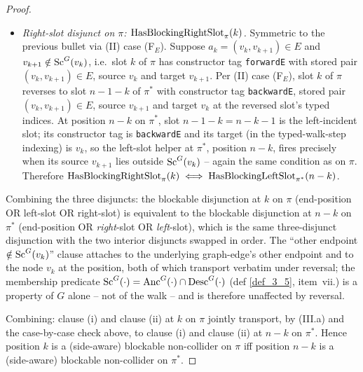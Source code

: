 \documentclass[main]{subfiles}
\begin{document}
\begin{proof}
\begin{itemize}
\begin{itemize}
            \item \emph{Right-slot disjunct on $\pi$: $\mathrm{HasBlockingRightSlot}_\pi(k)$.} Symmetric to the previous bullet via (II) case (F$_E$). Suppose $a_k = (v_k, v_{k+1}) \in E$ and $v_{k+1} \notin \mathrm{Sc}^G(v_k)$, i.e.\ slot $k$ of $\pi$ has constructor tag \texttt{forwardE} with stored pair $(v_k, v_{k+1}) \in E$, source $v_k$ and target $v_{k+1}$. Per (II) case (F$_E$), slot $k$ of $\pi$ reverses to slot $n - 1 - k$ of $\pi^*$ with constructor tag \texttt{backwardE}, stored pair $(v_k, v_{k+1}) \in E$, source $v_{k+1}$ and target $v_k$ at the reversed slot's typed indices. At position $n - k$ on $\pi^*$, slot $n - 1 - k = n - k - 1$ is the left-incident slot; its constructor tag is \texttt{backwardE} and its target (in the typed-walk-step indexing) is $v_k$, so the left-slot helper at $\pi^*$, position $n - k$, fires precisely when its source $v_{k+1}$ lies outside $\mathrm{Sc}^G(v_k)$ -- again the same condition as on $\pi$. Therefore $\mathrm{HasBlockingRightSlot}_\pi(k) \iff \mathrm{HasBlockingLeftSlot}_{\pi^*}(n - k)$.
        \end{itemize}
\end{itemize}
Combining the three disjuncts: the blockable disjunction at $k$ on $\pi$ (end-position OR left-slot OR right-slot) is equivalent to the blockable disjunction at $n - k$ on $\pi^*$ (end-position OR \emph{right}-slot OR \emph{left}-slot), which is the same three-disjunct disjunction with the two interior disjuncts swapped in order. The ``other endpoint $\notin \mathrm{Sc}^G(v_k)$'' clause attaches to the underlying graph-edge's other endpoint and to the node $v_k$ at the position, both of which transport verbatim under reversal; the membership predicate $\mathrm{Sc}^G(\cdot) = \mathrm{Anc}^G(\cdot) \cap \mathrm{Desc}^G(\cdot)$ (def \ref{def_3_5}, item~vii.) is a property of $G$ alone -- not of the walk -- and is therefore unaffected by reversal.

Combining: clause (i) and clause (ii) at $k$ on $\pi$ jointly transport, by (III.a) and the case-by-case check above, to clause (i) and clause (ii) at $n - k$ on $\pi^*$. Hence position $k$ is a (side-aware) blockable non-collider on $\pi$ iff position $n - k$ is a (side-aware) blockable non-collider on $\pi^*$.


\end{proof}
\end{document}
